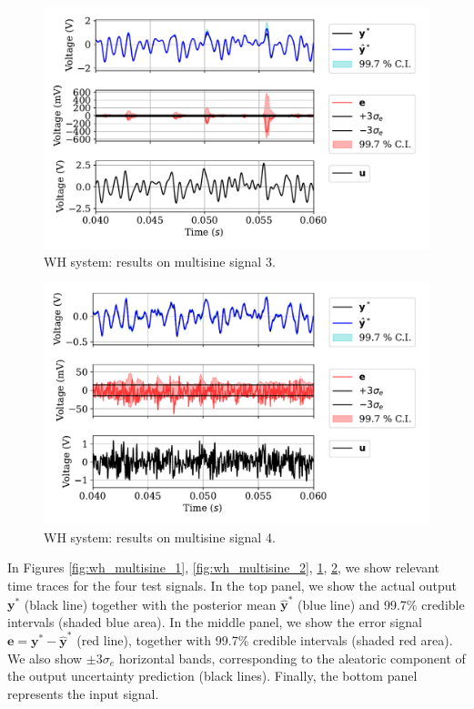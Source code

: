 \documentclass{ifacconf}
\newcommand{\tvec}[1]{{\mathbf{#1}}}
\newcommand{\mean}[1]{\hat{#1}}
\begin{document}
\begin{figure}%
 \centering
 \includegraphics[width=.8\linewidth]{img/MULTISINE_3.pdf}
 \caption{WH system: results on multisine signal 3.}
 \label{fig:wh_multisine_3}
\end{figure}

\begin{figure}%
 \centering
 \includegraphics[width=.8\linewidth]{img/MULTISINE_4.pdf}
 \caption{WH system: results on multisine signal 4.}
 \label{fig:wh_multisine_4}
\end{figure}

In Figures \ref{fig:wh_multisine_1}, \ref{fig:wh_multisine_2}, \ref{fig:wh_multisine_3}, \ref{fig:wh_multisine_4}, we show relevant time traces for the four test signals. In the top panel, we show the actual output $\tvec{y}^*$ (black line) together with the posterior mean $\mean{\tvec{y}}^*$ (blue line) and 99.7\% credible intervals (shaded blue area). In the middle panel, we show the error signal $\tvec{e}= \tvec{y}^*-\mean{\tvec{y}}^*$ (red line), together with 99.7\% credible intervals (shaded red area). We also show  $\pm 3 \sigma_e$ horizontal bands, corresponding to the aleatoric component of the output uncertainty prediction (black lines). Finally, the bottom panel represents the input signal. 
\end{document}
